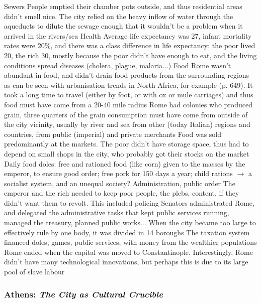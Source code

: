 \documentclass{article}
\begin{document}
\begin{outline}
	\1 Sewers
		\2 People emptied their chamber pots outside, and thus residential areas didn't smell nice. The city relied on the heavy inflow of water through the aqueducts to dilute the sewage enough that it wouldn't be a problem when it arrived in the rivers/sea
	\1 Health
		\2 Average life expectancy was 27, infant mortality rates were 20\%, and there was a class difference in life expectancy: the poor lived 20, the rich 30, mostly because the poor didn't have enough to eat, and the living conditions spread diseases (cholera, plague, malaria...)
	\1 Food
		\2 Rome wasn't abundant in food, and didn't drain food products from the surrounding regions as can be seen with urbanisation trends in North Africa, for example (p. 649). It took a long time to travel (either by foot, or with ox or mule carriages) and thus food must have come from a 20-40 mile radius
		\2 Rome had colonies who produced grain, three quarters of the grain consumption must have come from outside of the city vicinity, usually by river and sea from other (today Italian) regions and countries, from public (imperial) and private merchants
		\2 Food was sold predominantly at the markets. The poor didn't have storage space, thus had to depend on small shops in the city, who probably got their stocks on the market
		\2 Daily food doles: free and rationed food (like corn) given to the masses by the emperor, to ensure good order; free pork for 150 days a year; child rations $\rightarrow$ a socialist system, and an unequal society?
	\1 Administration, public order
		\2 The emperor and the rich needed to keep poor people, the plebs, content, if they didn't want them to revolt. This included policing
		\2 Senators administrated Rome, and delegated the administrative tasks that kept public services running, managed the treasury, planned public works...
		\2 When the city became too large to effectively rule by one body, it was divided in 14 boroughs
		\2 The taxation system financed doles, games, public services, with money from the wealthier populations
	\1 Rome ended when the capital was moved to Constantinople. Interestingly, Rome didn't have many technological innovations, but perhaps this is due to its large pool of slave labour
\end{outline}

\subsubsection{Athens: \textit{The City as Cultural Crucible} \parencite{hall1998cities}}
\end{document}
